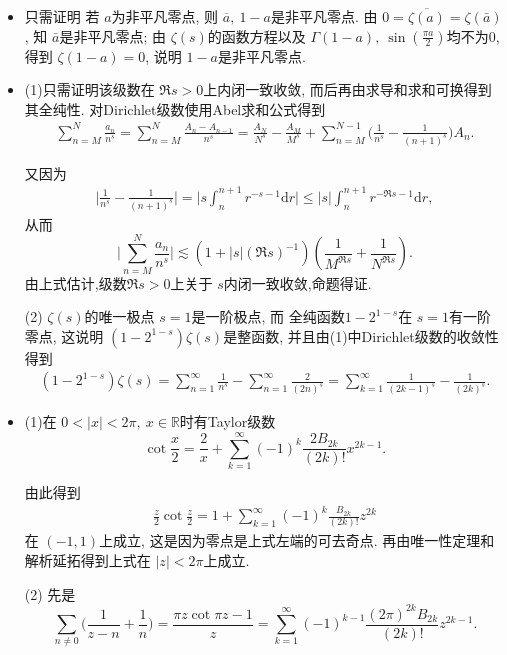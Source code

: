 \begin{itemize}
    \item[5.2.1] 只需证明 若 $a$为非平凡零点, 则 $\overline{a},\ 1-a$是非平凡零点.
    由 $0= \overline{\zeta(a)} = \zeta(\bar{a})$, 知 $\bar{a}$是非平凡零点;
    由 $\zeta(s)$的函数方程以及 $\Gamma(1-a),\ \sin(\frac{\pi a}{2})$均不为$0$, 
    得到 $\zeta(1-a)=0$, 说明 $1-a$是非平凡零点.
    \item[5.2.2] (1)只需证明该级数在 $\Re s>0$上内闭一致收敛, 
    而后再由求导和求和可换得到其全纯性. 对Dirichlet级数使用Abel求和公式得到
   \begin{align*}
    \sum_{n=M}^{N} \frac{a_n}{n^s}=   \sum_{n=M}^{N} \frac{A_n -A_{n-1}}{n^s} 
    =\frac{A_N}{N^s}-\frac{A_M}{M^s} +\sum_{n=M}^{N-1}\Big(\frac{1}{n^s}
    -\frac{1}{(n+1)^{s}}\Big)A_n.
   \end{align*}

   又因为
   \begin{align*}
    \bigg|\frac{1}{n^s}-\frac{1}{(n+1)^s}\bigg| 
    = \bigg|s \int_n^{n+1}r^{-s-1}\mathrm{d}r\bigg|
    \le |s|\int_{n}^{n+1}r^{-\Re s-1}\mathrm{d}r,
   \end{align*}
从而
$$\Bigg|\sum_{n=M}^{N} \frac{a_n}{n^s}\Bigg|\lesssim(1+|s|(\Re s)^{-1}) 
\left( \frac{1}{M^{\Re s}}+\frac{1}{N^{\Re s}} \right).$$
由上式估计,级数$\Re s>0$上关于 $s$内闭一致收敛,命题得证.

(2) $\zeta(s)$的唯一极点 $s=1$是一阶极点, 而 全纯函数$1-2^{1-s}$在 $s=1$有一阶零点, 
这说明  $(1-2^{1-s})\zeta(s)$是整函数, 并且由(1)中Dirichlet级数的收敛性得到
\begin{align*}
    (1-2^{1-s})\zeta(s) 
    = \sum_{n=1}^{\infty} \frac{1}{n^s} -  \sum_{n=1}^{\infty} \frac{2}{(2n)^s} 
    = \sum_{k=1}^{\infty}\frac{1}{(2k-1)^s}-\frac{1}{(2k)^s}.
\end{align*}

    \item[5.2.3]
(1)在 $0<|x|<2\pi,\ x\in \mathbb{R}$时有Taylor级数
$$\cot \frac{x}{2} = \frac{2}{x}
+ \sum_{k=1}^{\infty}(-1)^k \frac{2B_{2k}}{(2k)!}x^{2k-1}.$$

由此得到
\begin{align*}
    \frac{z}{2}\cot \frac{z}{2} 
    = 1+ \sum_{k=1}^{\infty}(-1)^k \frac{B_{2k}}{(2k)!}z^{2k}
\end{align*}
在 $(-1,1)$上成立, 这是因为零点是上式左端的可去奇点. 
再由唯一性定理和解析延拓得到上式在 $|z|<2\pi$上成立.

(2) 先是
$$\sum_{n \ne 0} \Big(\frac{1}{z-n}+\frac{1}{n}\Big) 
= \frac{\pi z\cot \pi z -1}{z} 
=  \sum_{k=1}^{\infty}(-1)^{k-1} \frac{(2 \pi)^{2k} B_{2k}}{(2k)!}z^{2k-1}.$$


\end{itemize}
